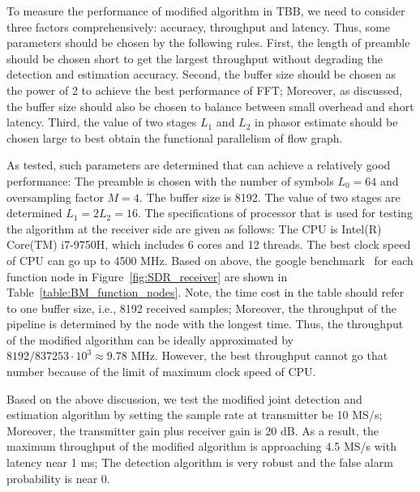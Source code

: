To measure the performance of modified algorithm in TBB, we need to consider 
three factors comprehensively: accuracy, throughput and latency. Thus, some parameters should be
chosen by the following rules. First, the length of preamble should be chosen short to get the largest throughput
without degrading the detection and estimation accuracy. Second, the buffer size should be chosen as the power of 2
to achieve the best performance of FFT; Moreover, as discussed, the buffer size should also be chosen
to balance between small overhead and short latency. Third, the value of two stages $L_1$ and $L_2$
in phasor estimate should be chosen large to best obtain the functional parallelism
of flow graph.

As tested, such parameters are determined that can achieve a relatively good performance: 
The preamble is chosen with the number of symbols $L_0=64$ and oversampling factor $M=4$.
The buffer size is 8192. The value of two stages are determined $L_1=2L_2=16$.
The specifications of processor that is used for testing the algorithm at the receiver side are given as follows:
The CPU is Intel(R) Core(TM) i7-9750H, which includes 6 cores and 12 threads.
The best clock speed of CPU can go up to 4500 MHz. Based on above, 
the google benchmark~\cite{Google_benchmark} for each function node in Figure~\ref{fig:SDR_receiver} are shown in Table~\ref{table:BM_function_nodes}.
Note, the time cost in the table should refer to one buffer size, i.e., 8192 received samples; Moreover, the throughput of 
the pipeline is determined by the node with the longest time. Thus, the throughput of the modified algorithm can be ideally approximated by
$8192/837253 \cdot 10^3 \approx 9.78$ MHz.
However, the best throughput cannot go that number because of the limit of maximum clock speed of CPU. 

Based on the above discussion, we test the modified joint detection and estimation algorithm by setting
the sample rate at transmitter be 10 MS/s; Moreover, the transmitter gain plus receiver gain
is 20 dB. As a result, the maximum throughput of the modified algorithm is approaching 4.5 MS/s with latency near 1 ms;
The detection algorithm is very robust and the false alarm probability is near 0.




